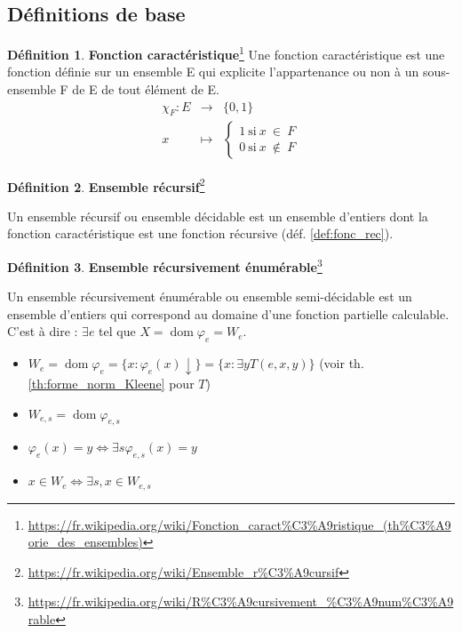 \documentclass{book}
\theoremstyle{definition}
\newtheorem{definition}{Définition}
\numberwithin{lemma}{subsection}
\numberwithin{theorem}{subsection}
\numberwithin{definition}{subsection}
\numberwithin{proposition}{subsection}
\numberwithin{corollary}{subsection}
\numberwithin{property}{subsection}
\numberwithin{example}{subsection}
\numberwithin{heuristique}{subsection}
\numberwithin{scenario}{subsection}
\DeclareMathOperator{\dom}{dom}
\begin{document}
    \subsection{Définitions de base}
            \begin{definition}\textbf{Fonction caractéristique}\footnote{\url{https://fr.wikipedia.org/wiki/Fonction\_caract\%C3\%A9ristique\_(th\%C3\%A9orie\_des\_ensembles)}}
                Une fonction caractéristique est une fonction définie sur un ensemble E qui explicite l’appartenance ou non à un sous-ensemble F de E de tout élément de E. 
                $$\begin{array}{rcl} \chi_F : E & \longrightarrow & \{0,1\}  \\
                x & \longmapsto & \left\{\begin{matrix}  1 \ \mbox{si} \ x \ \in \ F \\ 0 \ \mbox{si} \ x \ \notin \ F \end{matrix}\right. \end{array}$$
            \end{definition}
    
            \begin{definition}\textbf{Ensemble récursif}\footnote{\url{https://fr.wikipedia.org/wiki/Ensemble\_r\%C3\%A9cursif}}
                \par Un ensemble récursif ou ensemble décidable est un ensemble d'entiers dont la fonction caractéristique est une fonction récursive (déf. \ref{def:fonc_rec}).
            \end{definition}
        
            \begin{definition}\textbf{Ensemble récursivement énumérable}\footnote{\url{https://fr.wikipedia.org/wiki/R\%C3\%A9cursivement_\%C3\%A9num\%C3\%A9rable}}
                \par Un ensemble récursivement énumérable ou ensemble semi-décidable est un ensemble d'entiers qui correspond au domaine d'une fonction partielle calculable. C'est à dire : $\exists e$ tel que $X = \dom{\varphi_e} = W_e$.
                \begin{itemize}
                    \item $W_e = \dom \varphi_e = \{x : \varphi_e(x)\downarrow\} = \{x : \exists y T(e,x,y)\}$ (voir th. \ref{th:forme_norm_Kleene} pour $T$)
                    \item $W_{e,s} = \dom \varphi_{e,s}$
                    \item $\varphi_e(x) = y \Leftrightarrow \exists s \varphi_{e,s}(x) = y$
                    \item $ x \in W_e \Leftrightarrow \exists s, x \in W_{e,s} $
                \end{itemize}
            \end{definition}
            
\end{document}
